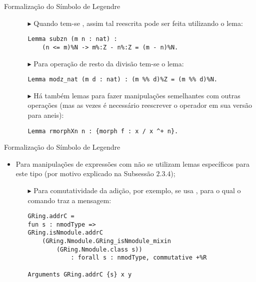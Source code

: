 \begin{frame}[fragile]{Formalização do Símbolo de Legendre}
    \begin{itemize}
        \item[]
        \begin{itemize}
            \item[$\blacktriangleright$] Quando  tem-se , assim tal reescrita pode ser feita utilizando o lema:
                \begin{lstlisting}[language=coq,frame=single,tabsize=1]
 Lemma subzn (m n : nat) : 
    (n <= m)%N -> m%:Z - n%:Z = (m - n)%N. 
                \end{lstlisting}

            \item[$\blacktriangleright$] Para operação de resto da divisão tem-se o lema:
                \begin{lstlisting}[language=coq,frame=single,tabsize=1]
Lemma modz_nat (m d : nat) : (m %% d)%Z = (m %% d)%N.
                \end{lstlisting}
            \item[$\blacktriangleright$] Há também lemas para fazer manipulações semelhantes com outras operações (mas as vezes é necessário reescrever o operador em sua versão para aneis):
                \begin{lstlisting}[language=coq,frame=single,tabsize=1]
Lemma rmorphXn n : {morph f : x / x ^+ n}.
                \end{lstlisting}
        \end{itemize}
    \end{itemize}
\end{frame}

\begin{frame}[fragile]{Formalização do Símbolo de Legendre}
    \begin{itemize}
        \item Para manipulações de expressões com  não se utilizam lemas específicos para este tipo (por motivo explicado na Subsessão $2.3.4$);
            \begin{itemize}
                \item[$\blacktriangleright$] Para comutatividade da adição, por exemplo, se usa , para o qual o comando  traz a mensagem:
                    \begin{lstlisting}[language=coq-error,frame=single,tabsize=1]
GRing.addrC =
fun s : nmodType =>
GRing.isNmodule.addrC
    (GRing.Nmodule.GRing_isNmodule_mixin 
        (GRing.Nmodule.class s))
            : forall s : nmodType, commutative +%R

Arguments GRing.addrC {s} x y
                    \end{lstlisting}
            \end{itemize}
    \end{itemize}
\end{frame}

